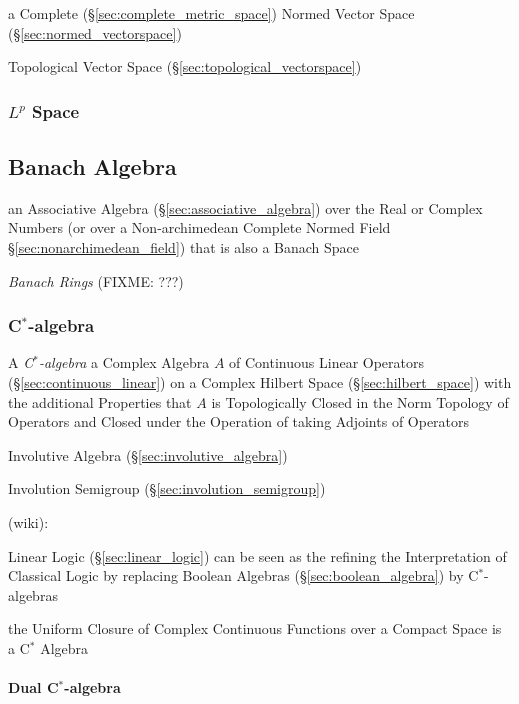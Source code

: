 a Complete (\S\ref{sec:complete_metric_space}) Normed Vector Space
(\S\ref{sec:normed_vectorspace})

Topological Vector Space (\S\ref{sec:topological_vectorspace})



\subsubsection{$L^p$ Space}\label{sec:lp_space}



\subsection{Banach Algebra}\label{sec:banach_algebra}

an Associative Algebra (\S\ref{sec:associative_algebra}) over the Real or
Complex Numbers (or over a Non-archimedean Complete Normed Field
\S\ref{sec:nonarchimedean_field}) that is also a Banach Space

\emph{Banach Rings} (FIXME: ???)



\subsubsection{C$^*$-algebra}\label{sec:cstar_algebra}

A \emph{C$^*$-algebra} a Complex Algebra $A$ of Continuous Linear
Operators (\S\ref{sec:continuous_linear}) on a Complex Hilbert Space
(\S\ref{sec:hilbert_space}) with the additional Properties that $A$ is
Topologically Closed in the Norm Topology of Operators and Closed
under the Operation of taking Adjoints of Operators

Involutive Algebra (\S\ref{sec:involutive_algebra})

Involution Semigroup (\S\ref{sec:involution_semigroup})

(wiki):

Linear Logic (\S\ref{sec:linear_logic}) can be seen as the refining
the Interpretation of Classical Logic by replacing Boolean Algebras
(\S\ref{sec:boolean_algebra}) by C$^*$-algebras

the Uniform Closure of Complex Continuous Functions over a Compact Space is a
C$^*$ Algebra



\paragraph{Dual C$^*$-algebra}\label{sec:cstar_dual}\hfill


